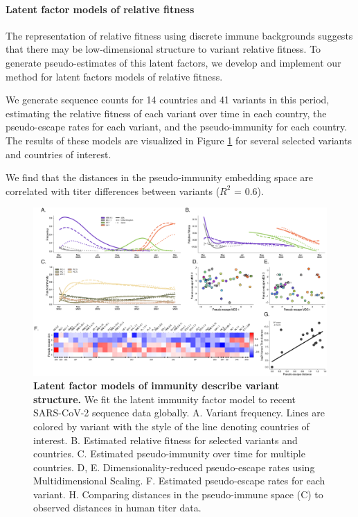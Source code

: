 \documentclass[12pt,oneside,letterpaper]{article}
\begin{document}
\paragraph{Latent factor models of relative fitness}

The representation of relative fitness using discrete immune backgrounds suggests that there may be low-dimensional structure to variant relative fitness.
To generate pseudo-estimates of this latent factors, we develop and implement our method for latent factors models of relative fitness.

We generate sequence counts for 14 countries and 41 variants in this period, estimating the relative fitness of each variant over time in each country, the pseudo-escape rates for each variant, and the pseudo-immunity for each country.
The results of these models are visualized in Figure \ref{fig:latent_immune} for several selected variants and countries of interest.

We find that the distances in the pseudo-immunity embedding space are correlated with titer differences between variants ($R^2$ = 0.6).

\begin{figure}[h]
    \centering
    \includegraphics[width=0.8\linewidth]{./figures/latent_immune.png}
    \caption{\textbf{Latent factor models of immunity describe variant structure.}
        We fit the latent immunity factor model to recent SARS-CoV-2 sequence data globally.
        A. Variant frequency. Lines are colored by variant with the style of the line denoting countries of interest.
        B. Estimated relative fitness for selected variants and countries.
        C. Estimated pseudo-immunity over time for multiple countries.
        D, E. Dimensionality-reduced pseudo-escape rates using Multidimensional Scaling.
        F. Estimated pseudo-escape rates for each variant.
        H. Comparing distances in the pseudo-immune space (C) to observed distances in human titer data.
    }
\label{fig:latent_immune}
\end{figure}
\end{document}
